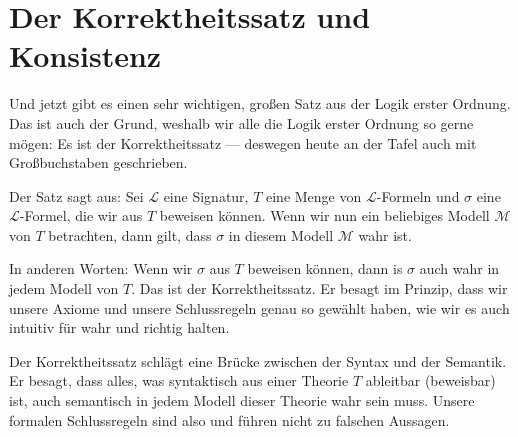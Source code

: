 \section{Der Korrektheitssatz und Konsistenz}

\begin{spoken-clean}[00:17:40 - 00:20:06]
Und jetzt gibt es einen sehr wichtigen, großen Satz aus der Logik erster Ordnung. Das ist auch der Grund, weshalb wir alle die Logik erster Ordnung so gerne mögen: Es ist der Korrektheitssatz --- deswegen heute an der Tafel auch mit Großbuchstaben geschrieben.

Der Satz sagt aus: Sei $\mathcal{L}$ eine Signatur, $T$ eine Menge von $\mathcal{L}$-Formeln und $\sigma$ eine $\mathcal{L}$-Formel, die wir aus $T$ beweisen können. Wenn wir nun ein beliebiges Modell $\mathcal{M}$ von $T$ betrachten, dann gilt, dass $\sigma$ in diesem Modell $\mathcal{M}$ wahr ist.

In anderen Worten: Wenn wir $\sigma$ aus $T$ beweisen können, dann is $\sigma$ auch wahr in jedem Modell von $T$. Das ist der Korrektheitssatz. Er besagt im Prinzip, dass wir unsere Axiome und unsere Schlussregeln genau so gewählt haben, wie wir es auch intuitiv für wahr und richtig halten.
\end{spoken-clean}

\begin{math-stroke}

\begin{explanation-of-steps}
Der Korrektheitssatz schlägt eine Brücke zwischen der Syntax und der Semantik. Er besagt, dass alles, was syntaktisch aus einer Theorie $T$ ableitbar (beweisbar) ist, auch semantisch in jedem Modell dieser Theorie wahr sein muss. Unsere formalen Schlussregeln sind also  und führen nicht zu falschen Aussagen.
\end{explanation-of-steps}
\end{math-stroke}

